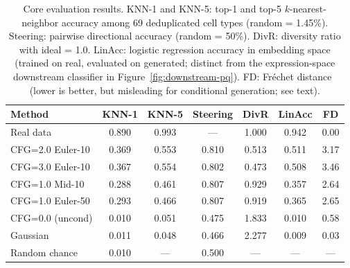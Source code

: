 \documentclass[genes,article,submit,pdftex,oneauthor]{Definitions/mdpi}
\begin{document}
\begin{table}[!htbp]
\caption{Core evaluation results. KNN-1 and KNN-5: top-1 and top-5 $k$-nearest-neighbor accuracy among 69 deduplicated cell types (random = 1.45\%). Steering: pairwise directional accuracy (random = 50\%). DivR: diversity ratio with ideal = 1.0. LinAcc: logistic regression accuracy in embedding space (trained on real, evaluated on generated; distinct from the expression-space downstream classifier in Figure~\ref{fig:downstream-pq}). FD: Fr\'{e}chet distance~\cite{ref-fid} (lower is better, but misleading for conditional generation; see text).\label{tab:core-results}}
\begin{tabularx}{\textwidth}{lCCCCCC}
\toprule
\textbf{Method} & \textbf{KNN-1} & \textbf{KNN-5} & \textbf{Steering} & \textbf{DivR} & \textbf{LinAcc} & \textbf{FD} \\
\midrule
Real data        & 0.890 & 0.993 & ---   & 1.000 & 0.942 & 0.00 \\
CFG=2.0 Euler-10 & 0.369 & 0.553 & 0.810 & 0.513 & 0.511 & 3.17 \\
CFG=3.0 Euler-10 & 0.367 & 0.554 & 0.802 & 0.473 & 0.508 & 3.46 \\
CFG=1.0 Mid-10   & 0.288 & 0.461 & 0.807 & 0.929 & 0.357 & 2.64 \\
CFG=1.0 Euler-50 & 0.293 & 0.466 & 0.807 & 0.919 & 0.365 & 2.65 \\
CFG=0.0 (uncond) & 0.010 & 0.051 & 0.475 & 1.833 & 0.010 & 0.58 \\
Gaussian          & 0.011 & 0.048 & 0.466 & 2.277 & 0.009 & 0.03 \\
\midrule
Random chance    & 0.010 & ---   & 0.500 & ---   & ---   & ---  \\
\bottomrule
\end{tabularx}
\end{table}
\end{document}

